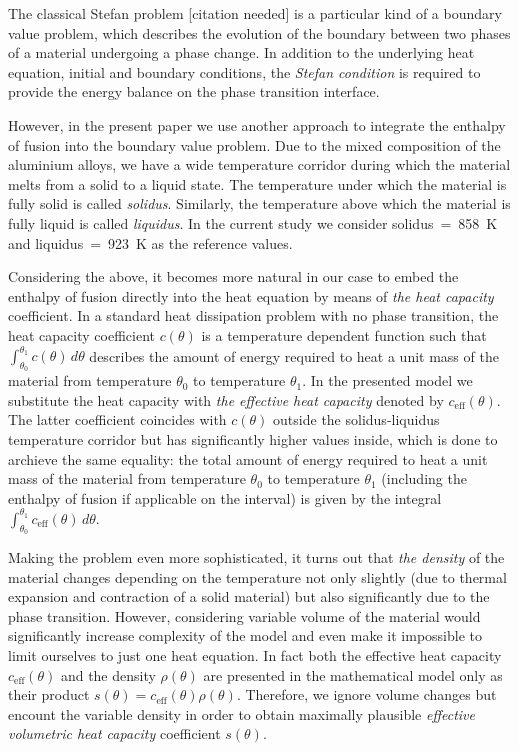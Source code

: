 The classical Stefan problem [citation needed] is a particular kind of a boundary value problem, which describes the evolution of the boundary between two phases of a material undergoing a phase change. In addition to the underlying heat equation, initial and boundary conditions, the \emph{Stefan condition} is required to provide the energy balance on the phase transition interface.

However, in the present paper we use another approach to integrate the enthalpy of fusion into the boundary value problem. Due to the mixed composition of the aluminium alloys, we have a wide temperature corridor during which the material melts from a solid to a liquid state. The temperature under which the material is fully solid is called \emph{solidus}. Similarly, the temperature above which the material is fully liquid is called \emph{liquidus}. In the current study we consider solidus~=~\SI{858}{\K} and liquidus~=~\SI{923}{K} as the reference values.

Considering the above, it becomes more natural in our case to embed the enthalpy of fusion directly into the heat equation by means of \emph{the heat capacity} coefficient. In a standard heat dissipation problem with no phase transition, the heat capacity coefficient $c(\theta)$ is a temperature dependent function such that $\int_{\theta_0}^{\theta_1} c(\theta)\, d\theta$ describes the amount of energy required to heat a unit mass of the material from temperature $\theta_0$ to temperature $\theta_1$. In the presented model we substitute the heat capacity with \emph{the effective heat capacity} denoted by $c_{\text{eff}}(\theta)$. The latter coefficient coincides with $c(\theta)$ outside the solidus-liquidus temperature corridor but has significantly higher values inside, which is done to archieve the same equality: the total amount of energy required to heat a unit mass of the material from temperature $\theta_0$ to temperature $\theta_1$ (including the enthalpy of fusion if applicable on the interval) is given by the integral $\int_{\theta_0}^{\theta_1} c_{\text{eff}}(\theta)\, d\theta$.

Making the problem even more sophisticated, it turns out that \emph{the density} of the material changes depending on the temperature not only slightly (due to thermal expansion and contraction of a solid material) but also significantly due to the phase transition. However, considering variable volume of the material would significantly increase complexity of the model and even make it impossible to limit ourselves to just one heat equation. In fact both the effective heat capacity $c_\text{eff}(\theta)$ and the density $\rho(\theta)$ are presented in the mathematical model only as their product $s(\theta) = c_\text{eff}(\theta) \rho(\theta)$. Therefore, we ignore volume changes but encount the variable density in order to obtain maximally plausible \emph{effective volumetric heat capacity} coefficient $s(\theta)$.

